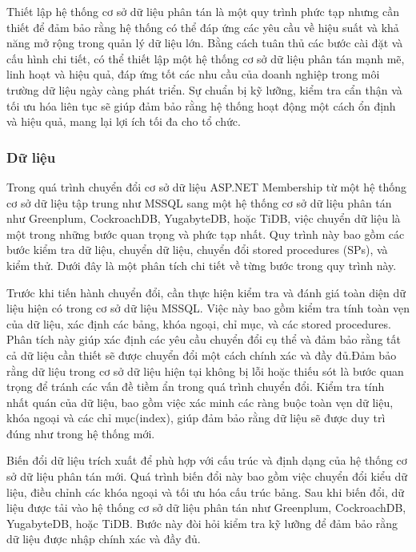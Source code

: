 \documentclass[14pt]{article}
\begin{document}
Thiết lập hệ thống cơ sở dữ liệu phân tán là một quy trình phức tạp nhưng cần thiết để đảm bảo rằng hệ thống có thể đáp ứng các yêu cầu về hiệu suất và khả năng mở rộng trong quản lý dữ liệu lớn. Bằng cách tuân thủ các bước cài đặt và cấu hình chi tiết, có thể thiết lập một hệ thống cơ sở dữ liệu phân tán mạnh mẽ, linh hoạt và hiệu quả, đáp ứng tốt các nhu cầu của doanh nghiệp trong môi trường dữ liệu ngày càng phát triển. Sự chuẩn bị kỹ lưỡng, kiểm tra cẩn thận và tối ưu hóa liên tục sẽ giúp đảm bảo rằng hệ thống hoạt động một cách ổn định và hiệu quả, mang lại lợi ích tối đa cho tổ chức.

\subsubsection{Dữ liệu}

Trong quá trình chuyển đổi cơ sở dữ liệu ASP.NET Membership từ một hệ thống cơ sở dữ liệu tập trung như MSSQL sang một hệ thống cơ sở dữ liệu phân tán như Greenplum, CockroachDB, YugabyteDB, hoặc TiDB, việc chuyển dữ liệu là một trong những bước quan trọng và phức tạp nhất. Quy trình này bao gồm các bước kiểm tra dữ liệu, chuyển dữ liệu, chuyển đổi stored procedures (SPs), và kiểm thử. Dưới đây là một phân tích chi tiết về từng bước trong quy trình này.

Trước khi tiến hành chuyển đổi, cần thực hiện kiểm tra và đánh giá toàn diện dữ liệu hiện có trong cơ sở dữ liệu MSSQL. Việc này bao gồm kiểm tra tính toàn vẹn của dữ liệu, xác định các bảng, khóa ngoại, chỉ mục, và các stored procedures. Phân tích này giúp xác định các yêu cầu chuyển đổi cụ thể và đảm bảo rằng tất cả dữ liệu cần thiết sẽ được chuyển đổi một cách chính xác và đầy đủ.Đảm bảo rằng dữ liệu trong cơ sở dữ liệu hiện tại không bị lỗi hoặc thiếu sót là bước quan trọng để tránh các vấn đề tiềm ẩn trong quá trình chuyển đổi. Kiểm tra tính nhất quán của dữ liệu, bao gồm việc xác minh các ràng buộc toàn vẹn dữ liệu, khóa ngoại và các chỉ mục(index), giúp đảm bảo rằng dữ liệu sẽ được duy trì đúng như trong hệ thống mới.


Biến đổi dữ liệu trích xuất để phù hợp với cấu trúc và định dạng của hệ thống cơ sở dữ liệu phân tán mới. Quá trình biến đổi này bao gồm việc chuyển đổi kiểu dữ liệu, điều chỉnh các khóa ngoại và tối ưu hóa cấu trúc bảng. Sau khi biến đổi, dữ liệu được tải vào hệ thống cơ sở dữ liệu phân tán như Greenplum, CockroachDB, YugabyteDB, hoặc TiDB. Bước này đòi hỏi kiểm tra kỹ lưỡng để đảm bảo rằng dữ liệu được nhập chính xác và đầy đủ.
\end{document}
